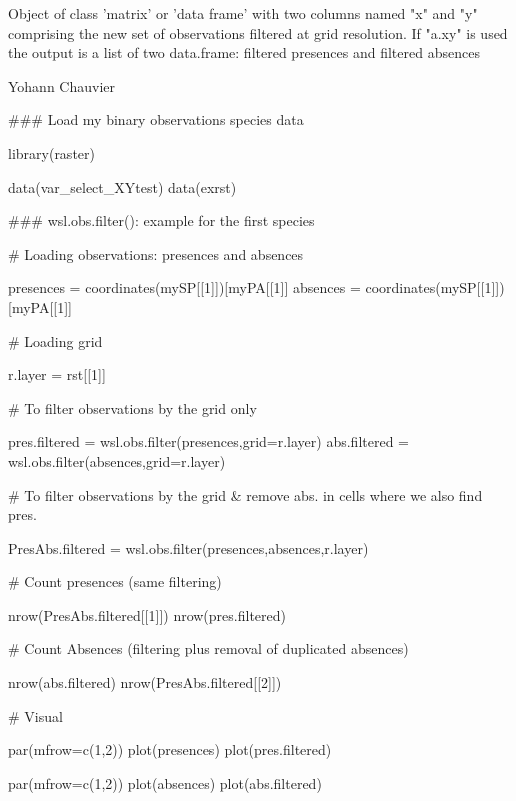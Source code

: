 \documentclass[a4paper]{book}
\begin{document}
%
\begin{Value}
Object of class 'matrix' or 'data frame' with two columns named "x" and "y"
comprising the new set of observations filtered at grid resolution. If "a.xy" is
used the output is a list of two data.frame: filtered presences and filtered absences
\end{Value}
%
\begin{Author}\relax
Yohann Chauvier
\end{Author}
%
\begin{Examples}
\begin{ExampleCode}

### Load my binary observations species data

library(raster)

data(var_select_XYtest)
data(exrst)

### wsl.obs.filter(): example for the first species

   # Loading observations: presences and absences

presences = coordinates(mySP[[1]])[myPA[[1]] %
absences = coordinates(mySP[[1]])[myPA[[1]] %

   # Loading grid

r.layer = rst[[1]]

   # To filter observations by the grid only

pres.filtered = wsl.obs.filter(presences,grid=r.layer)
abs.filtered = wsl.obs.filter(absences,grid=r.layer)

   # To filter observations by the grid & remove abs. in cells where we also find pres.

PresAbs.filtered = wsl.obs.filter(presences,absences,r.layer)

   # Count presences (same filtering)

nrow(PresAbs.filtered[[1]])
nrow(pres.filtered)

   # Count Absences (filtering plus removal of duplicated absences)

nrow(abs.filtered)
nrow(PresAbs.filtered[[2]])

   # Visual

par(mfrow=c(1,2))
plot(presences)
plot(pres.filtered)

par(mfrow=c(1,2))
plot(absences)
plot(abs.filtered)

\end{ExampleCode}
\end{Examples}
\end{document}
